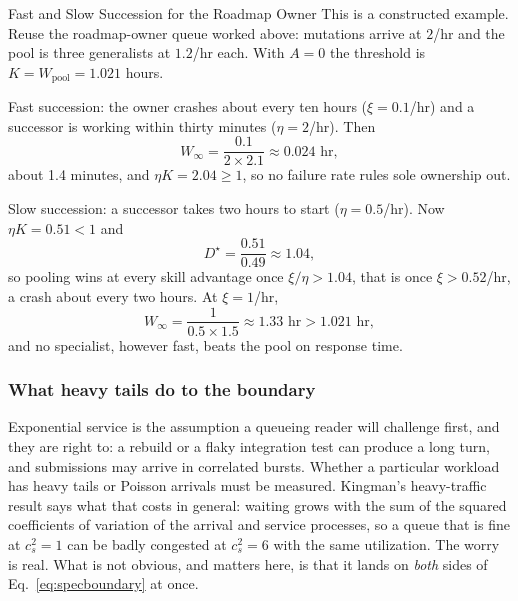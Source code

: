 \documentclass[11pt,a4paper]{article}
\theoremstyle{definition}
\theoremstyle{plain}
\begin{document}
\begin{pdexample}{Fast and Slow Succession for the Roadmap Owner}
\setlength{\parskip}{4pt plus 1pt}
This is a constructed example. Reuse the roadmap-owner queue worked above:
mutations arrive at $2$/hr and the pool is three generalists at $1.2$/hr each.
With $A=0$ the threshold is $K=W_{\mathrm{pool}}=1.021$ hours.

Fast succession: the owner crashes about every ten hours ($\xi=0.1$/hr) and a
successor is working within thirty minutes ($\eta=2$/hr). Then
\[
W_\infty=\frac{0.1}{2\times2.1}\approx0.024\text{ hr},
\]
about 1.4 minutes, and $\eta K=2.04\ge1$, so no failure rate rules sole
ownership out.

Slow succession: a successor takes two hours to start ($\eta=0.5$/hr). Now
$\eta K=0.51<1$ and
\[
D^\star=\frac{0.51}{0.49}\approx1.04,
\]
so pooling wins at every skill advantage once $\xi/\eta>1.04$, that is once
$\xi>0.52$/hr, a crash about every two hours. At $\xi=1$/hr,
\[
W_\infty=\frac{1}{0.5\times1.5}\approx1.33\text{ hr}>1.021\text{ hr},
\]
and no specialist, however fast, beats the pool on response time.
\end{pdexample}


\subsubsection{What heavy tails do to the boundary}\label{sec:spec-heavy-tails}

\ifpdmargincolumn\pdheavytailsketch\fi
Exponential service is the assumption a queueing reader will challenge first, and
they are right to: a rebuild or a flaky integration test can produce a long turn,
and submissions may arrive in correlated bursts. Whether a particular workload
has heavy tails or Poisson arrivals must be measured. Kingman's heavy-traffic result  says what
that costs in general: waiting grows with the sum of the squared coefficients of
variation of the arrival and service processes, so a queue that is fine at
$c_s^2=1$ can be badly congested at $c_s^2=6$ with the same utilization. The
worry is real. What is not obvious, and matters here, is that it lands on
\emph{both} sides of Eq.~\ref{eq:specboundary} at once.
\end{document}
